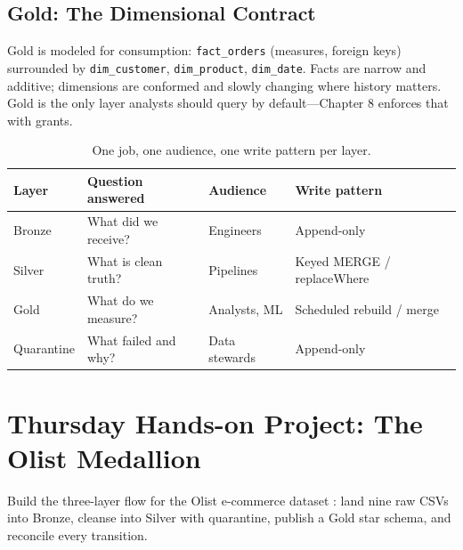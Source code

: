 \subsection{Gold: The Dimensional Contract}
Gold is modeled for consumption: \texttt{fact\_orders} (measures, foreign keys) surrounded by \texttt{dim\_customer}, \texttt{dim\_product}, \texttt{dim\_date}. Facts are narrow and additive; dimensions are conformed and slowly changing where history matters. Gold is the only layer analysts should query by default---Chapter 8 enforces that with grants.

\begin{table}[H]
\centering
\small
\begin{tabular}{@{}p{2.2cm}p{4.2cm}p{3.2cm}p{3.4cm}@{}}
\toprule
\textbf{Layer} & \textbf{Question answered} & \textbf{Audience} & \textbf{Write pattern} \\
\midrule
Bronze & What did we receive? & Engineers & Append-only \\
Silver & What is clean truth? & Pipelines & Keyed MERGE / replaceWhere \\
Gold & What do we measure? & Analysts, ML & Scheduled rebuild / merge \\
Quarantine & What failed and why? & Data stewards & Append-only \\
\bottomrule
\end{tabular}
\caption{One job, one audience, one write pattern per layer.}
\label{tab:ch3-layers}
\end{table}

\section{Thursday Hands-on Project: The Olist Medallion}
Build the three-layer flow for the Olist e-commerce dataset \cite{olistDataset}: land nine raw CSVs into Bronze, cleanse into Silver with quarantine, publish a Gold star schema, and reconcile every transition.

